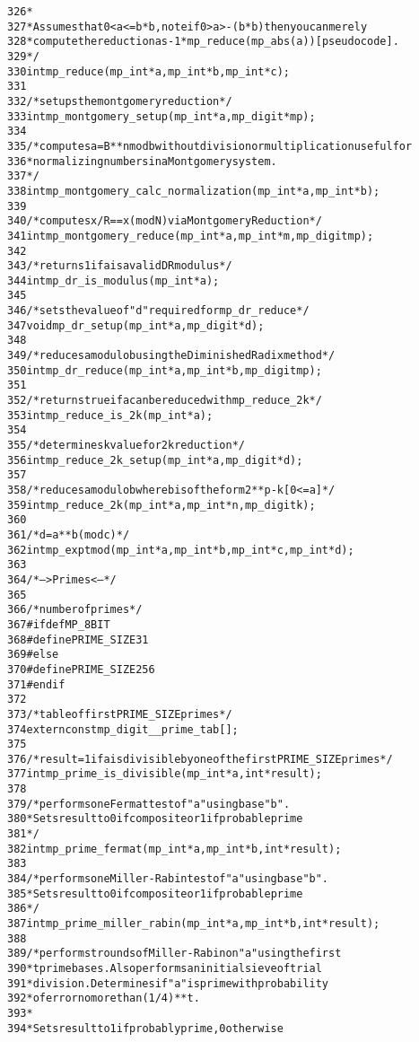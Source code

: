 \documentclass[b5paper]{book}
\begin{document}
\begin{small}
\begin{alltt}
326    *
327    * Assumes that 0 < a <= b*b, note if 0 > a > -(b*b) then you can merely
328    * compute the reduction as -1 * mp_reduce(mp_abs(a)) [pseudo code].
329    */
330   int mp_reduce(mp_int *a, mp_int *b, mp_int *c);
331   
332   /* setups the montgomery reduction */
333   int mp_montgomery_setup(mp_int *a, mp_digit *mp);
334   
335   /* computes a = B**n mod b without division or multiplication useful for
336    * normalizing numbers in a Montgomery system.
337    */
338   int mp_montgomery_calc_normalization(mp_int *a, mp_int *b);
339   
340   /* computes x/R == x (mod N) via Montgomery Reduction */
341   int mp_montgomery_reduce(mp_int *a, mp_int *m, mp_digit mp);
342   
343   /* returns 1 if a is a valid DR modulus */
344   int mp_dr_is_modulus(mp_int *a);
345   
346   /* sets the value of "d" required for mp_dr_reduce */
347   void mp_dr_setup(mp_int *a, mp_digit *d);
348   
349   /* reduces a modulo b using the Diminished Radix method */
350   int mp_dr_reduce(mp_int *a, mp_int *b, mp_digit mp);
351   
352   /* returns true if a can be reduced with mp_reduce_2k */
353   int mp_reduce_is_2k(mp_int *a);
354   
355   /* determines k value for 2k reduction */
356   int mp_reduce_2k_setup(mp_int *a, mp_digit *d);
357   
358   /* reduces a modulo b where b is of the form 2**p - k [0 <= a] */
359   int mp_reduce_2k(mp_int *a, mp_int *n, mp_digit k);
360   
361   /* d = a**b (mod c) */
362   int mp_exptmod(mp_int *a, mp_int *b, mp_int *c, mp_int *d);
363   
364   /* ---> Primes <--- */
365   
366   /* number of primes */
367   #ifdef MP_8BIT
368      #define PRIME_SIZE      31
369   #else
370      #define PRIME_SIZE      256
371   #endif
372   
373   /* table of first PRIME_SIZE primes */
374   extern const mp_digit __prime_tab[];
375   
376   /* result=1 if a is divisible by one of the first PRIME_SIZE primes */
377   int mp_prime_is_divisible(mp_int *a, int *result);
378   
379   /* performs one Fermat test of "a" using base "b".
380    * Sets result to 0 if composite or 1 if probable prime
381    */
382   int mp_prime_fermat(mp_int *a, mp_int *b, int *result);
383   
384   /* performs one Miller-Rabin test of "a" using base "b".
385    * Sets result to 0 if composite or 1 if probable prime
386    */
387   int mp_prime_miller_rabin(mp_int *a, mp_int *b, int *result);
388   
389   /* performs t rounds of Miller-Rabin on "a" using the first
390    * t prime bases.  Also performs an initial sieve of trial
391    * division.  Determines if "a" is prime with probability
392    * of error no more than (1/4)**t.
393    *
394    * Sets result to 1 if probably prime, 0 otherwise

\end{alltt}
\end{small}
\end{document}
